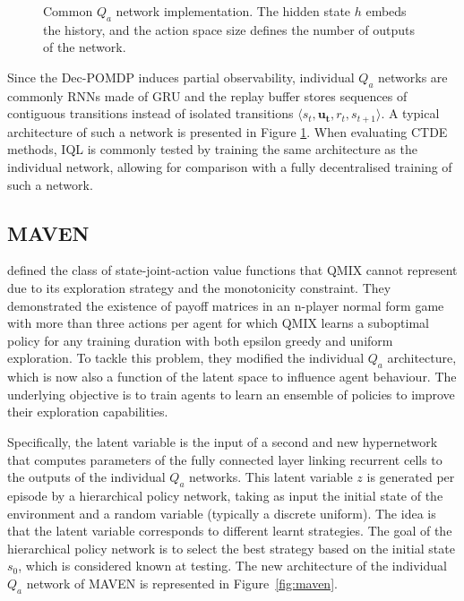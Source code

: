 \begin{figure}
    \centering

\caption{Common $Q_a$ network implementation. The hidden state $h$ embeds the history, and the action space size defines the number of outputs of the network.}
\label{fig:ch3_indivQ}
\end{figure}

Since the Dec-POMDP induces partial observability, individual $Q_a$ networks are commonly RNNs made of GRU \citep{Chung2014EmpiricalModeling} and the replay buffer stores sequences of contiguous transitions instead of isolated transitions $\langle s_{t},\mathbf{u_{t}},r_{t},s_{t+1}\rangle$.
A typical architecture of such a network is presented in Figure \ref{fig:ch3_indivQ}.
When evaluating CTDE methods, IQL is commonly tested by training the same architecture as the individual network, allowing for comparison with a fully decentralised training of such a network.

\subsection{MAVEN}
\citet{Mahajan2019MAVEN:Exploration} defined the class of state-joint-action value functions that QMIX cannot represent due to its exploration strategy and the monotonicity constraint.
They demonstrated the existence of payoff matrices in an n-player normal form game with more than three actions per agent for which QMIX learns a suboptimal policy for any training duration with both epsilon greedy and uniform exploration.
To tackle this problem, they modified the individual $Q_a$ architecture, which is now also a function of the latent space to influence agent behaviour.
The underlying objective is to train agents to learn an ensemble of policies to improve their exploration capabilities.

Specifically, the latent variable is the input of a second and new hypernetwork that computes parameters of the fully connected layer linking recurrent cells to the outputs of the individual $Q_a$ networks.
This latent variable $z$ is generated per episode by a hierarchical policy network, taking as input the initial state of the environment and a random variable (typically a discrete uniform).
The idea is that the latent variable corresponds to different learnt strategies.
The goal of the hierarchical policy network is to select the best strategy based on the initial state $s_0$, which is considered known at testing.
The new architecture of the individual $Q_a$ network of MAVEN is represented in Figure~\ref{fig:maven}.

